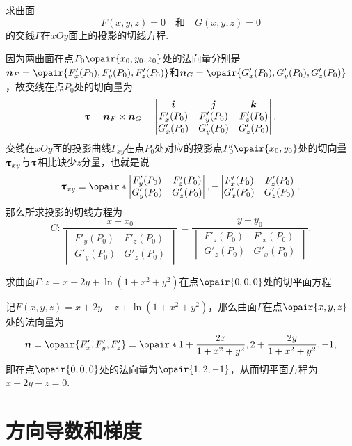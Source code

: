 \begin{example}
求曲面\[
F(x,y,z) = 0
\quad\text{和}\quad
G(x,y,z) = 0
\]的交线\(\Gamma\)在\(xOy\)面上的投影的切线方程.
\begin{solution}
因为两曲面在点\(P_0\opair{x_0,y_0,z_0}\)处的法向量分别是\(\mat{n}_F = \opair{F'_x(P_0),F'_y(P_0),F'_z(P_0)}\)和\(\mat{n}_G = \opair{G'_x(P_0),G'_y(P_0),G'_z(P_0)}\)，故交线在点\(P_0\)处的切向量为\[
\boldsymbol{\uptau}
= \boldsymbol{n}_F \times \boldsymbol{n}_G
= \begin{vmatrix}
\boldsymbol{i} & \boldsymbol{j} & \boldsymbol{k} \\
F'_x(P_0) & F'_y(P_0) & F'_z(P_0) \\
G'_x(P_0) & G'_y(P_0) & G'_z(P_0)
\end{vmatrix}.
\]交线在\(xOy\)面的投影曲线\(\Gamma_{xy}\)在点\(P_0\)处对应的投影点\(P'_0\opair{x_0,y_0}\)处的切向量\(\boldsymbol{\uptau}_{xy}\)与\(\boldsymbol{\uptau}\)相比缺少\(z\)分量，也就是说\[
\mat{\tau}_{xy} = \opair*{\begin{vmatrix}
F'_y(P_0) & F'_z(P_0) \\
G'_y(P_0) & G'_z(P_0)
\end{vmatrix}, -\begin{vmatrix}
F'_x(P_0) & F'_z(P_0) \\
G'_x(P_0) & G'_z(P_0)
\end{vmatrix}}.
\]那么所求投影的切线方程为\[
C: \frac{x - x_0}{\begin{vmatrix}
F'_y(P_0) & F'_z(P_0) \\
G'_y(P_0) & G'_z(P_0)
\end{vmatrix}} = \frac{y - y_0}{\begin{vmatrix}
F'_z(P_0) & F'_x(P_0) \\
G'_z(P_0) & G'_x(P_0)
\end{vmatrix}}.
\]
\end{solution}
\end{example}

\begin{example}
求曲面\(\Gamma: z = x + 2y + \ln(1+x^2+y^2)\)在点\(\opair{0,0,0}\)处的切平面方程.
\begin{solution}
记\(F(x,y,z) = x + 2y - z + \ln(1+x^2+y^2)\)，那么曲面\(\Gamma\)在点\(\opair{x,y,z}\)处的法向量为\[
\mat{n} = \opair{F'_x,F'_y,F'_z}
= \opair*{
1 + \frac{2x}{1+x^2+y^2},
2 + \frac{2y}{1+x^2+y^2},
-1
},
\]即在点\(\opair{0,0,0}\)处的法向量为\(\opair{1,2,-1}\)，从而切平面方程为\(x+2y-z=0\).
\end{solution}
\end{example}

\section{方向导数和梯度}
